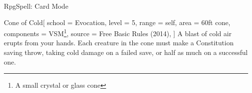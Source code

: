 \begin{ExampleBlock}{RpgSpell: Card Mode}
\begin{RpgSpell}[width=6cm, height=9cm]{Cone of Cold}[
    school = Evocation,
    level = 5,
    range = self,
    area = 60ft cone,
    components = VSM\footnote{A small crystal or glass cone},
    source = Free Basic Rules (2014),
]
    A blast of cold air erupts from your hands. Each creature in the cone must make a Constitution saving throw, taking  cold damage on a failed save, or half as much on a successful one.

\end{RpgSpell}


\end{ExampleBlock}
